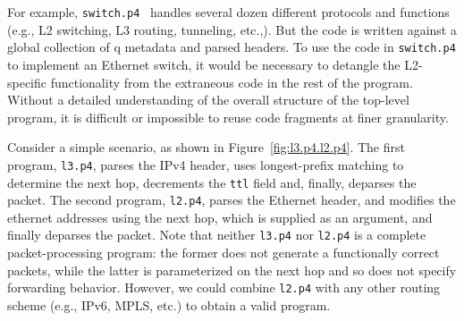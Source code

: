 For example, \texttt{switch.p4}~\cite{switch.p4} handles several dozen
different protocols and functions (e.g., L2 switching, L3 routing,
tunneling, etc.,). But the code is written against a global collection
of q metadata and parsed headers. To use the code in
\texttt{switch.p4} to implement an Ethernet switch, it would be
necessary to detangle the L2-specific functionality from the
extraneous code in the rest of the program. Without a detailed
understanding of the overall structure of the top-level program, it is
difficult or impossible to reuse code fragments at finer granularity.

Consider a simple scenario, as shown in Figure~\ref{fig:l3.p4.l2.p4}.
The first program, \texttt{l3.p4}, parses the IPv4 header, uses
longest-prefix matching to determine the next hop, decrements the
\texttt{ttl} field and, finally, deparses the packet. The second
program, \texttt{l2.p4}, parses the Ethernet header, and modifies the
ethernet addresses using the next hop, which is supplied as an
argument, and finally deparses the packet. Note that neither
\texttt{l3.p4} nor \texttt{l2.p4} is a complete packet-processing
program: the former does not generate a functionally correct packets,
while the latter is parameterized on the next hop and so does not
specify forwarding behavior. However, we could combine \texttt{l2.p4}
with any other routing scheme (e.g., IPv6, MPLS, etc.) to obtain a
valid program. 

